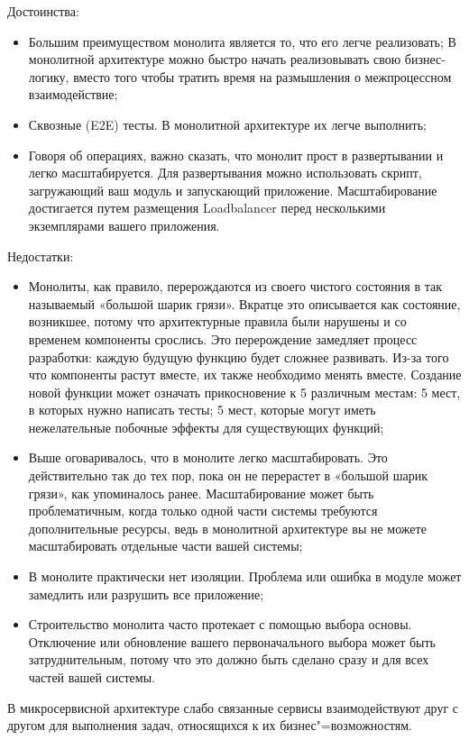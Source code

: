 Достоинства:
\begin{itemize}
    \item Большим преимуществом монолита является то, что его легче реализовать;
    В монолитной архитектуре можно быстро начать реализовывать свою бизнес-логику, вместо того чтобы тратить время на размышления о межпроцессном взаимодействие;
    \item Сквозные (E2E) тесты. В монолитной архитектуре их легче выполнить;
    \item Говоря об операциях, важно сказать, что монолит прост в развертывании и легко масштабируется.
    Для развертывания можно использовать скрипт, загружающий ваш модуль и запускающий приложение. Масштабирование достигается путем размещения Loadbalancer перед несколькими экземплярами вашего приложения.
\end{itemize}
Недостатки:
\begin{itemize}
    \item Монолиты, как правило, перерождаются из своего чистого состояния в так называемый «большой шарик грязи».
    Вкратце это описывается как состояние, возникшее, потому что архитектурные правила были нарушены и со временем компоненты срослись.
    Это перерождение замедляет процесс разработки: каждую будущую функцию будет сложнее развивать.
    Из-за того что компоненты растут вместе, их также необходимо менять вместе.
    Создание новой функции может означать прикосновение к 5 различным местам: 5 мест, в которых нужно написать тесты; 5 мест, которые могут иметь нежелательные побочные эффекты для существующих функций;
    \item Выше оговаривалось, что в монолите легко масштабировать.
    Это действительно так до тех пор, пока он не перерастет в «большой шарик грязи», как упоминалось ранее.
    Масштабирование может быть проблематичным, когда только одной части системы требуются дополнительные ресурсы, ведь в монолитной архитектуре вы не можете масштабировать отдельные части вашей системы;
    \item В монолите практически нет изоляции.
    Проблема или ошибка в модуле может замедлить или разрушить все приложение;
    \item Строительство монолита часто протекает с помощью выбора основы.
    Отключение или обновление вашего первоначального выбора может быть затруднительным, потому что это должно быть сделано сразу и для всех частей вашей системы.
\end{itemize}
\bigbreak

В микросервисной архитектуре слабо связанные сервисы взаимодействуют друг с другом для выполнения задач, относящихся к их бизнес"=возможностям.

